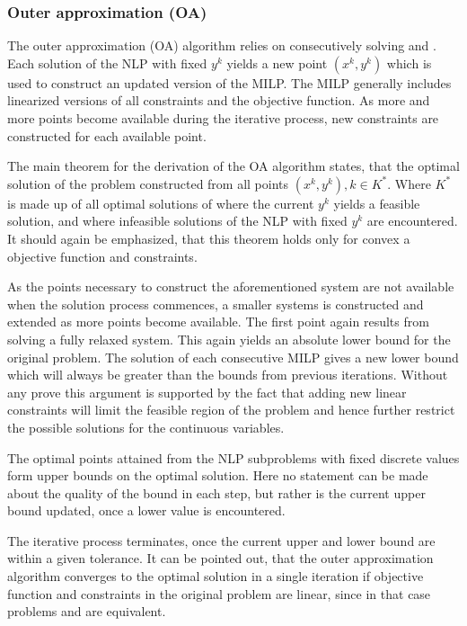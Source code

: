         \subsubsection{Outer approximation (OA)}
        The outer approximation (OA) algorithm relies on consecutively solving  and 
        . Each solution of the NLP with fixed $y^k$ yields a new point $(x^k,y^k)$ which is used to 
        construct an updated version of the MILP. The MILP generally includes linearized versions of all constraints and 
        the objective function. As more and more points become available during the iterative process, new constraints 
        are constructed for each available point.

        The main theorem for the derivation of the OA algorithm states, that the optimal solution of the problem 
         constructed from all points $(x^k,y^k), k \in K^{\ast}$. Where $K^{\ast}$ is made up of 
        all optimal solutions of  where the current $y^k$ yields a feasible solution, and 
         where infeasible solutions of the NLP with fixed $y^k$ are encountered. It should 
        again be emphasized, that this theorem holds only for convex a objective function and constraints.

        As the points necessary to construct the aforementioned system are not available when the solution process 
        commences, a smaller systems is constructed and extended as more points become available. The first point again 
        results from solving a fully relaxed system.  This again yields an absolute lower bound for the original problem. The solution of each consecutive 
        MILP gives a new lower bound which will always be greater than the bounds from previous iterations. Without any 
        prove this argument is supported by the fact that adding new linear constraints will limit the feasible region of 
        the problem and hence further restrict the possible solutions for the continuous variables.

        The optimal points attained from the NLP subproblems with fixed discrete values form upper bounds on the optimal 
        solution. Here no statement can be made about the quality of the bound in each step, but rather is the current 
        upper bound updated, once a lower value is encountered.

        The iterative process terminates, once the current upper and lower bound are within a given tolerance. It can be 
        pointed out, that the outer approximation algorithm converges to the optimal solution in a single iteration if 
        objective function and constraints in the original problem are linear, since in that case problems 
         and  are equivalent. 
        
